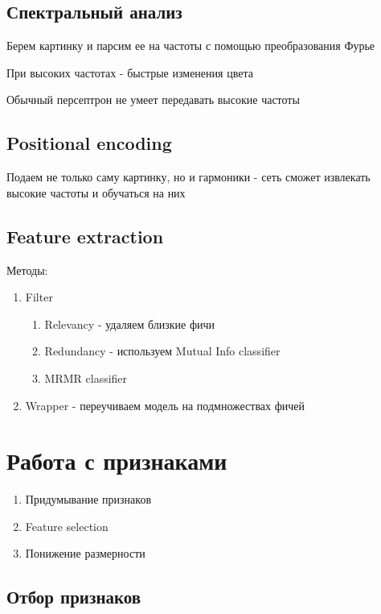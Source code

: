 \documentclass[a4paper, 12pt]{article}
\begin{document}
\subsection{Спектральный анализ}

Берем картинку и парсим ее на частоты с помощью
преобразования Фурье

При высоких частотах - быстрые изменения цвета

Обычный персептрон не умеет передавать высокие частоты

\subsection{Positional encoding}

Подаем не только саму картинку, но и гармоники - сеть
сможет извлекать высокие частоты и обучаться на них

\subsection{Feature extraction}

Методы:

\begin{enumerate}
    \item Filter
    \begin{enumerate}
        \item Relevancy - удаляем близкие фичи
        \item Redundancy - используем Mutual Info classifier
        \item MRMR classifier
    \end{enumerate}
    \item Wrapper - переучиваем модель на подмножествах фичей
\end{enumerate}

\section{Работа с признаками}

\begin{enumerate}
    \item Придумывание признаков
    \item Feature selection
    \item Понижение размерности
\end{enumerate}

\subsection{Отбор признаков}
\end{document}
